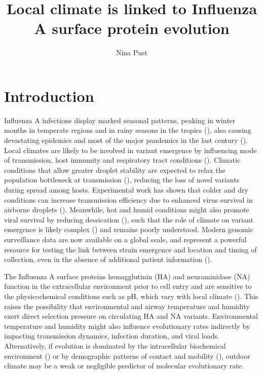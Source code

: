 \documentclass{pnas-new}
\title{Local climate is linked to Influenza A surface protein evolution}
\author[1]{Nina Pust}
\affil[1]{Department of Public Health, University of Copenhagen, Copenhagen, Denmark}
\begin{document}
\maketitle

\section*{Introduction}

Influenza A infections display marked seasonal patterns, peaking in winter months in temperate regions and in rainy seasons in the tropics (\cite{petrova_evolution_2018}), also causing devastating epidemics and most of the major pandemics in the last century (\cite{hsieh_influenza_2006, trovao_when_2020}). Local climates are likely to be involved in variant emergence by influencing mode of transmission, host immunity and respiratory tract conditions (\cite{kudo_low_2019}). Climatic conditions that allow greater droplet stability are expected to relax the population bottleneck at transmission (\cite{frise_contact_2016}), reducing the loss of novel variants during spread among hosts. Experimental work has shown that colder and dry conditions can increase transmission efficiency due to enhanced virus survival in airborne droplets (\cite{lowen_influenza_2007, shaman_absolute_2009}). Meanwhile, hot and humid conditions might also promote viral survival by reducing dessication (\cite{minhaz_ud-dean_structural_2010}), such that the role of climate on variant emergence is likely complex (\cite{deyle_global_2016}) and remains poorly understood. Modern genomic surveillance data are now available on a global scale, and represent a powerful resource for testing the link between strain emergence and location and timing of collection, even in the absence of additional patient information (\cite{volz_viral_2013}).  

The Influenza A surface proteins hemagglutinin (HA) and neuraminidase (NA) function in the extracellular environment prior to cell entry and are sensitive to the physicochemical conditions such as pH, which vary with local climate (\cite{klenow_influenza_2023, tosheva_hemagglutinin_2023}). This raises the possibility that environmental and airway temperature and humidity exert direct selection pressure on circulating HA and NA variants. %
Environmental temperature and humidity might also influence evolutionary rates indirectly by impacting transmission dynamics, infection duration, and viral loads. Alternatively, if evolution is dominated by the intracellular biochemical environment (\cite{partlow_influenza_2025}) or by demographic patterns of contact and mobility (\cite{cauchemez_role_2011, endo_within_2021}), outdoor climate may be a weak or negligible predictor of molecular evolutionary rate.
\end{document}
